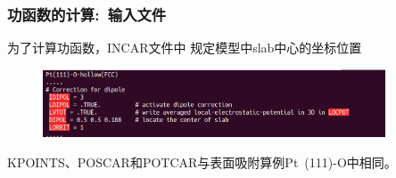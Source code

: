 \frame
{
	\frametitle{功函数的计算:~输入文件}
为了计算功函数，\textrm{INCAR}文件中%
规定模型中\textrm{slab}中心的坐标位置%
\begin{figure}[h!]
\centering
\includegraphics[width=4.0in,viewport=0 0 680 150,clip]{Figures/Pt_surface-workfunction-INCAR.png}
\caption{\fontsize{6.2pt}{5.2pt}}%
\label{Pt_surface-workfunction-INCAR}
\end{figure}

\textrm{KPOINTS}、\textrm{POSCAR}和\textrm{POTCAR}与表面吸附算例\textrm{Pt~(111)-O}中相同。
}
\frame
